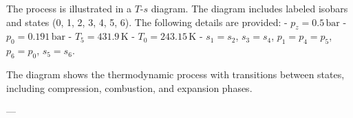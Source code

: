 The process is illustrated in a \( T \)-\( s \) diagram. The diagram includes labeled isobars and states (0, 1, 2, 3, 4, 5, 6). The following details are provided:  
- \( p_z = 0.5 \, \text{bar} \)  
- \( p_0 = 0.191 \, \text{bar} \)  
- \( T_5 = 431.9 \, \text{K} \)  
- \( T_0 = 243.15 \, \text{K} \)  
- \( s_1 = s_2 \), \( s_3 = s_4 \), \( p_1 = p_4 = p_5 \), \( p_6 = p_0 \), \( s_5 = s_6 \).  

The diagram shows the thermodynamic process with transitions between states, including compression, combustion, and expansion phases.  

---